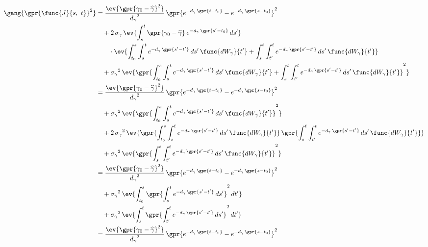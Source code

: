 \begin{align}
    \gang{\gpr{\func{J}{s,\ t}}^2} &= \frac{\ev{\gpr{\gamma_{0} - \widehat{\gamma}}^2}}{{d_{\gamma}}^2}\,\gpr{e^{-d_{\gamma}\,\gpr{t - t_{0}}} - e^{-d_{\gamma}\,\gpr{s - t_{0}}}}^2 \nonumber \\
    		&\quad + 2\,\sigma_{\gamma}\,\ev{\int_{s}^{t} \gpr{\gamma_0 - \widehat{\gamma}}\,e^{-d_{\gamma}\,\gpr{s' - t_0}}\,ds'} \nonumber \\
    			&\qquad \cdot \ev{\int_{t_{0}}^{s} \int_{s}^{t} e^{-d_{\gamma}\,\gpr{s' - t'}}\,ds'\,\func{d{W}_{\gamma}}{t'} + \int_{s}^{t} \int_{t'}^{t} e^{-d_{\gamma}\,\gpr{s' - t'}}\,ds'\,\func{d{W}_{\gamma}}{t'}} \nonumber \\
    		&\quad + {\sigma_{\gamma}}^2\,\ev{\gpr{\int_{t_{0}}^{s} \int_{s}^{t} e^{-d_{\gamma}\,\gpr{s' - t'}}\,ds'\,\func{d{W}_{\gamma}}{t'} + \int_{s}^{t} \int_{t'}^{t} e^{-d_{\gamma}\,\gpr{s' - t'}}\,ds'\,\func{d{W}_{\gamma}}{t'}}^2} \nonumber \\
    	&= \frac{\ev{\gpr{\gamma_{0} - \widehat{\gamma}}^2}}{{d_{\gamma}}^2}\,\gpr{e^{-d_{\gamma}\,\gpr{t - t_{0}}} - e^{-d_{\gamma}\,\gpr{s - t_{0}}}}^2 \nonumber \\
    		&\quad + {\sigma_{\gamma}}^2\,\ev{\gpr{\int_{t_{0}}^{s} \int_{s}^{t} e^{-d_{\gamma}\,\gpr{s' - t'}}\,ds'\,\func{d{W}_{\gamma}}{t'}}^2} \nonumber \\
    		&\quad + 2\,{\sigma_{\gamma}}^2\,\ev{\gpr{\int_{t_{0}}^{s} \int_{s}^{t} e^{-d_{\gamma}\,\gpr{s' - t'}}\,ds'\,\func{d{W}_{\gamma}}{t'}}\,\gpr{\int_{s}^{t} \int_{t'}^{t} e^{-d_{\gamma}\,\gpr{s' - t'}}\,ds'\,\func{d{W}_{\gamma}}{t'}}} \nonumber \\
    		&\quad + {\sigma_{\gamma}}^2\,\ev{\gpr{\int_{s}^{t} \int_{t'}^{t} e^{-d_{\gamma}\,\gpr{s' - t'}}\,ds'\,\func{d{W}_{\gamma}}{t'}}^2} \nonumber \\
    	&= \frac{\ev{\gpr{\gamma_{0} - \widehat{\gamma}}^2}}{{d_{\gamma}}^2}\,\gpr{e^{-d_{\gamma}\,\gpr{t - t_{0}}} - e^{-d_{\gamma}\,\gpr{s - t_{0}}}}^2 \nonumber \\
    		&\quad + {\sigma_{\gamma}}^2\,\ev{\int_{t_{0}}^{s} \gpr{\int_{s}^{t} e^{-d_{\gamma}\,\gpr{s' - t'}}\,ds'}^2\,dt'} \nonumber \\
    		&\quad + {\sigma_{\gamma}}^2\,\ev{\int_{s}^{t} \gpr{\int_{t'}^{t} e^{-d_{\gamma}\,\gpr{s' - t'}}\,ds'}^2\,dt'} \nonumber \\
    	&= \frac{\ev{\gpr{\gamma_{0} - \widehat{\gamma}}^2}}{{d_{\gamma}}^2}\,\gpr{e^{-d_{\gamma}\,\gpr{t - t_{0}}} - e^{-d_{\gamma}\,\gpr{s - t_{0}}}}^2 \nonumber \\

\end{align}
